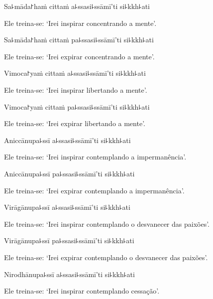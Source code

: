 Sa꜕māda꜓haṁ cittaṁ a꜕ssasi꜕ssāmī'ti si꜕kkh꜕ati

\begin{english}
  Ele treina-se: `Irei inspirar concentrando a mente'.
\end{english}

Sa꜕māda꜓haṁ cittaṁ pa꜕ssasi꜕ssāmī'ti si꜕kkh꜕ati

\begin{english}
  Ele treina-se: `Irei expirar concentrando a mente'.
\end{english}

Vimoca꜓yaṁ cittaṁ a꜕ssasi꜕ssāmī'ti si꜕kkh꜕ati

\begin{english}
  Ele treina-se: `Irei inspirar libertando a mente'.
\end{english}

Vimoca꜓yaṁ cittaṁ pa꜕ssasi꜕ssāmī'ti si꜕kkh꜕ati

\begin{english}
  Ele treina-se: `Irei expirar libertando a mente'.
\end{english}

Aniccānupa꜕ssī a꜕ssasi꜕ssāmī'ti si꜕kkh꜕ati

\begin{english}
  Ele treina-se: `Irei inspirar contemplando a impermanência'.
\end{english}

Aniccānupa꜕ssī pa꜕ssasi꜕ssāmī'ti si꜕kkh꜕ati

\begin{english}
  Ele treina-se: `Irei expirar contemplando a impermanência'.
\end{english}

Virāgānupa꜕ssī a꜕ssasi꜕ssāmī'ti si꜕kkh꜕ati

\begin{english}
  Ele treina-se: `Irei inspirar contemplando o desvanecer das paixões'.
\end{english}

Virāgānupa꜕ssī pa꜕ssasi꜕ssāmī'ti si꜕kkh꜕ati

\begin{english}
  Ele treina-se: `Irei expirar contemplando o desvanecer das paixões'.
\end{english}

Nirodhānupa꜕ssī a꜕ssasi꜕ssāmī'ti si꜕kkh꜕ati

\begin{english}
  Ele treina-se: `Irei inspirar contemplando cessação'.
\end{english}

